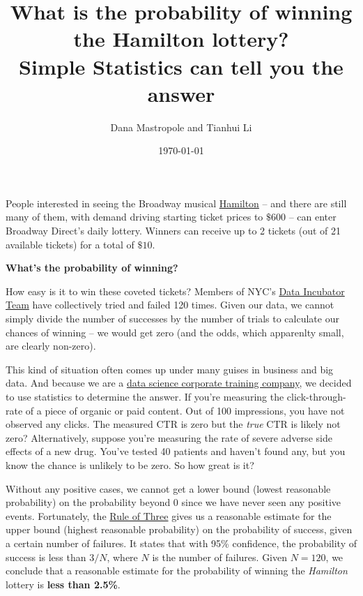 \documentclass[12pt]{article}
\begin{document}
\title{What is the probability of winning the Hamilton lottery?\\
\large Simple Statistics can tell you the answer}
\author{Dana Mastropole and Tianhui Li}
\date{\today}
\maketitle

People interested in seeing the Broadway musical \href{https://lottery.broadwaydirect.com/show/hamilton/}{Hamilton} -- and there are still many of them, with demand driving starting ticket prices to $\$600$ -- can enter Broadway Direct's daily lottery. Winners can receive up to 2 tickets (out of 21 available tickets) for a total of $\$10$.

\vspace{5mm}

\textbf{What's the probability of winning?}

How easy is it to win these coveted tickets? Members of NYC's \href{https://www.thedataincubator.com/}{Data Incubator Team} have collectively tried and failed 120 times. Given our data, we cannot simply divide the number of successes by the number of trials to calculate our chances of winning -- we would get zero (and the odds, which apparenlty small, are clearly non-zero).

This kind of situation often comes up under many guises in business and big data.  And because we are a \href{https://www.thedataincubator.com/training.html}{data science corporate training company}, we decided to use statistics to determine the answer.  If you're measuring the click-through-rate of a piece of organic or paid content.  Out of 100 impressions, you have not observed any clicks.  The measured CTR is zero but the \textit{true} CTR is likely not zero?  Alternatively, suppose you're measuring the rate of severe adverse side effects of a new drug.  You've tested 40 patients and haven't found any, but you know the chance is unlikely to be zero.  So how great is it?

Without any positive cases, we cannot get a lower bound (lowest reasonable probability) on the probability beyond 0 since we have never seen any positive events. Fortunately, the \href{https://en.wikipedia.org/wiki/Rule\_of\_three\_(statistics)}{Rule of Three} gives us a reasonable estimate for the upper bound (highest reasonable probability) on the probability of success, given a certain number of failures. It states that with 95\% confidence, the probability of success is less than $3/N$, where $N$ is the number of failures. Given $N = 120$, we conclude that a reasonable estimate for the probability of winning the \textit{Hamilton} lottery is \textbf{less than 2.5\%}.
\end{document}
